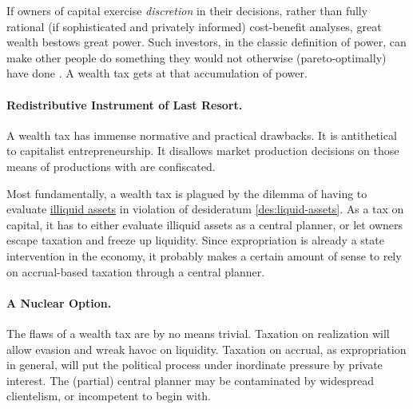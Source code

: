 If owners of capital exercise \emph{discretion} in their decisions, rather than fully rational (if sophisticated and privately informed) cost-benefit analyses, great wealth bestows great power.
Such investors, in the classic definition of power, can make other people do something they would not otherwise (pareto-optimally) have done \citep[8ff]{Geoff2002}.
A wealth tax gets at that accumulation of power.

\paragraph{Redistributive Instrument of Last Resort.}
A wealth tax has immense normative and practical drawbacks.
It is antithetical to capitalist entrepreneurship.
It disallows market production decisions on those means of productions with are confiscated.

Most fundamentally, a wealth tax is plagued by the dilemma of having to evaluate \hyperref[des:liquid-assets]{illiquid assets} in violation of desideratum \ref{des:liquid-assets}.
As a tax on capital, it has to either evaluate illiquid assets as a central planner, or let owners escape taxation and freeze up liquidity.
Since expropriation is already a state intervention in the economy, it probably makes a certain amount of sense to rely on accrual-based taxation through a central planner.

\paragraph{A Nuclear Option.}
The flaws of a wealth tax are by no means trivial.
Taxation on realization will allow evasion and wreak havoc on liquidity.
Taxation on accrual, as expropriation in general, will put the political process under inordinate pressure by private interest.
The (partial) central planner may be contaminated by widespread clientelism, or incompetent to begin with.

